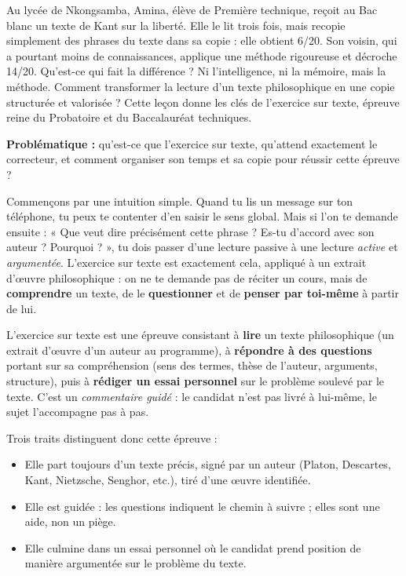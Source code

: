 \documentclass[11pt]{article}
\newcommand{\cle}[1]{{\popxbold\color{popdark}#1}}
\newcounter{popsec}
\newcounter{popsub}
\newcommand{\courssub}[1]{%
  \stepcounter{popsub}%
  \par\vspace{9pt}\noindent{\popxbold\fontsize{11.5}{13}\selectfont\color{popink}{\color{poporange}\thepopsec.\thepopsub}\hspace{6pt}#1}\par\nopagebreak\vspace{4pt}
}
\begin{document}
Au lycée de Nkongsamba, Amina, élève de Première technique, reçoit au Bac blanc un texte de Kant sur la liberté. Elle le lit trois fois, mais recopie simplement des phrases du texte dans sa copie : elle obtient 6/20. Son voisin, qui a pourtant moins de connaissances, applique une méthode rigoureuse et décroche 14/20. Qu'est-ce qui fait la différence ? Ni l'intelligence, ni la mémoire, mais la \cle{méthode}. Comment transformer la lecture d'un texte philosophique en une copie structurée et valorisée ? Cette leçon donne les clés de l'exercice sur texte, épreuve reine du Probatoire et du Baccalauréat techniques.

\textbf{Problématique :} qu'est-ce que l'exercice sur texte, qu'attend exactement le correcteur, et comment organiser son temps et sa copie pour réussir cette épreuve ?

\courssub{Définition et nature de l'épreuve}

Commençons par une intuition simple. Quand tu lis un message sur ton téléphone, tu peux te contenter d'en saisir le sens global. Mais si l'on te demande ensuite : « Que veut dire précisément cette phrase ? Es-tu d'accord avec son auteur ? Pourquoi ? », tu dois passer d'une lecture passive à une lecture \emph{active} et \emph{argumentée}. L'exercice sur texte est exactement cela, appliqué à un extrait d'œuvre philosophique : on ne te demande pas de réciter un cours, mais de \textbf{comprendre} un texte, de le \textbf{questionner} et de \textbf{penser par toi-même} à partir de lui.

\begin{definition}
L'\cle{exercice sur texte} est une épreuve consistant à \textbf{lire} un texte philosophique (un extrait d'œuvre d'un auteur au programme), à \textbf{répondre à des questions} portant sur sa compréhension (sens des termes, thèse de l'auteur, arguments, structure), puis à \textbf{rédiger un essai personnel} sur le problème soulevé par le texte. C'est un \emph{commentaire guidé} : le candidat n'est pas livré à lui-même, le sujet l'accompagne pas à pas.
\end{definition}

Trois traits distinguent donc cette épreuve :
\begin{itemize}
\item Elle part toujours d'un \cle{texte} précis, signé par un auteur (Platon, Descartes, Kant, Nietzsche, Senghor, etc.), tiré d'une œuvre identifiée.
\item Elle est \cle{guidée} : les questions indiquent le chemin à suivre ; elles sont une aide, non un piège.
\item Elle culmine dans un \cle{essai personnel} où le candidat prend position de manière argumentée sur le problème du texte.
\end{itemize}
\end{document}
